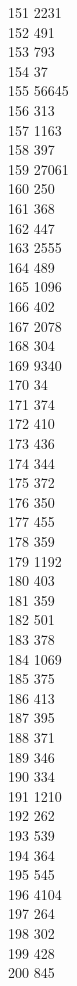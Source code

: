 { 151	2231 \\
 152	491 \\
 153	793 \\
 154	37 \\
 155	56645 \\
 156	313 \\
 157	1163 \\
 158	397 \\
 159	27061 \\
 160	250 \\
 161	368 \\
 162	447 \\
 163	2555 \\
 164	489 \\
 165	1096 \\
 166	402 \\
 167	2078 \\
 168	304 \\
 169	9340 \\
 170	34 \\
 171	374 \\
 172	410 \\
 173	436 \\
 174	344 \\
 175	372 \\
 176	350 \\
 177	455 \\
 178	359 \\
 179	1192 \\
 180	403 \\
 181	359 \\
 182	501 \\
 183	378 \\
 184	1069 \\
 185	375 \\
 186	413 \\
 187	395 \\
 188	371 \\
 189	346 \\
 190	334 \\
 191	1210 \\
 192	262 \\
 193	539 \\
 194	364 \\
 195	545 \\
 196	4104 \\
 197	264 \\
 198	302 \\
 199	428 \\
 200	845 \\
}
